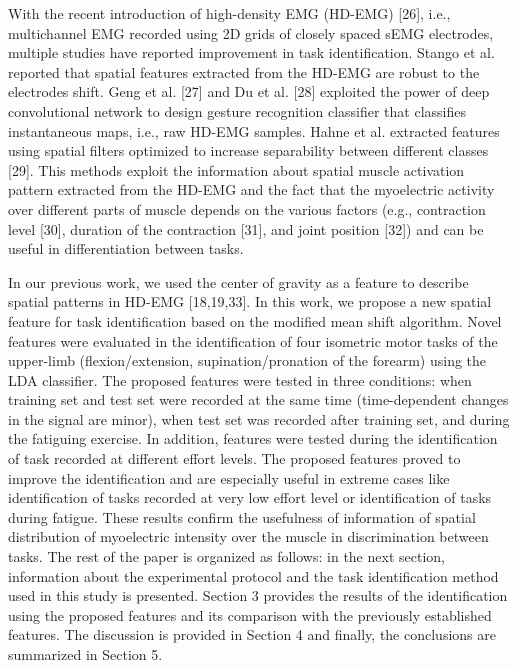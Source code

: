 With the recent introduction of high-density EMG (HD-EMG) [26], i.e., multichannel EMG recorded using 2D grids of closely spaced sEMG electrodes, multiple studies have reported improvement in task identification. Stango et al. reported that spatial features extracted from the HD-EMG are robust to the electrodes shift. Geng et al. [27] and Du et al. [28] exploited the power of deep convolutional network to design gesture recognition classifier that classifies instantaneous maps, i.e., raw HD-EMG samples. Hahne et al. extracted features using spatial filters optimized to increase separability between different classes [29]. This methods exploit the information about spatial muscle activation pattern extracted from the HD-EMG and the fact that the myoelectric activity over different parts of muscle depends on the various factors (e.g., contraction level [30], duration of the contraction [31], and joint position [32]) and can be useful in differentiation between tasks.

In our previous work, we used the center of gravity as a feature to describe spatial patterns in HD-EMG [18,19,33]. In this work, we propose a new spatial feature for task identification based on the modified mean shift algorithm. Novel features were evaluated in the identification of four isometric motor tasks of the upper-limb (flexion/extension, supination/pronation of the forearm) using the LDA classifier. The proposed features were tested in three conditions: when training set and test set were recorded at the same time (time-dependent changes in the signal are minor), when test set was recorded after training set, and during the fatiguing exercise. In addition, features were tested during the identification of task recorded at different effort levels. The proposed features proved to improve the identification and are especially useful in extreme cases like identification of tasks recorded at very low effort level or identification of tasks during fatigue. These results confirm the usefulness of information of spatial distribution of myoelectric intensity over the muscle in discrimination between tasks.
The rest of the paper is organized as follows: in the next section, information about the experimental protocol and the task identification method used in this study is presented. Section 3 provides the results of the identification using the proposed features and its comparison with the previously established features. The discussion is provided in Section 4 and finally, the conclusions are summarized in Section 5.\\
\clearpage

